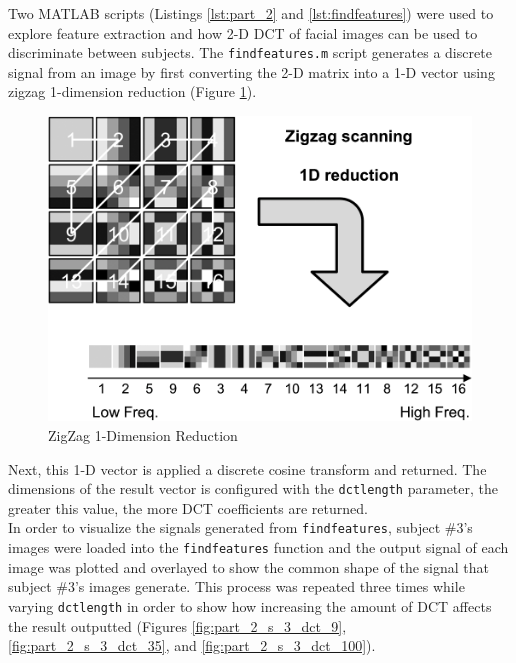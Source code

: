 \documentclass[conference]{IEEEtran}
\begin{document}
  Two MATLAB\texttrademark{} scripts (Listings \ref{lst:part_2} and
  \ref{lst:findfeatures}) were used to explore feature extraction and how 2-D
  DCT of facial images can be used to discriminate between subjects. The
  \texttt{findfeatures.m} script generates a discrete signal from an image by
  first converting the 2-D matrix into a 1-D vector using zigzag 1-dimension
  reduction (Figure \ref{fig:zigzag}).
  \begin{figure}[H]
    \centering
    \includegraphics[scale=0.2]{./img/zigzag.png}
    \caption{ZigZag 1-Dimension Reduction \cite{digital video}}
    \label{fig:zigzag}
  \end{figure}

  Next, this 1-D vector is applied a discrete cosine transform and returned. The
  dimensions of the result vector is configured with the \texttt{dctlength}
  parameter, the greater this value, the more DCT coefficients are returned.
  \\
  In order to visualize the signals generated from \texttt{findfeatures},
  subject \#3's images were loaded into the \texttt{findfeatures} function and
  the output signal of each image was plotted and overlayed to show the common
  shape of the signal that subject \#3's images generate. This process was
  repeated three times while varying \texttt{dctlength} in order to show how
  increasing the amount of DCT affects the result outputted (Figures
  \ref{fig:part_2_s_3_dct_9}, \ref{fig:part_2_s_3_dct_35}, and
  \ref{fig:part_2_s_3_dct_100}).
\end{document}
